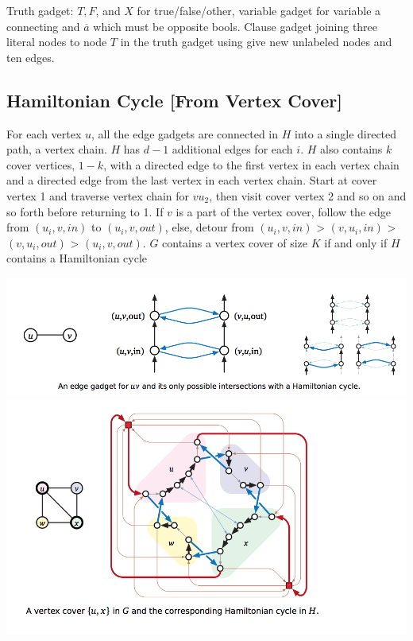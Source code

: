 Truth gadget: $T,F$, and $X$ for true/false/other, variable gadget for variable a connecting and $\overbar{a}$ which must be opposite bools. Clause gadget joining three literal nodes to node $T$ in the truth gadget using give new unlabeled nodes and ten edges.

\subsection{Hamiltonian Cycle [From Vertex Cover]}

For each vertex $u$, all the edge gadgets are connected in $H$ into a single directed path, a vertex chain. $H$ has $d-1$ additional edges for each $i$. $H$ also contains $k$ cover vertices, $1 - k$, with a directed edge to the first vertex in each vertex chain and a directed edge from the last vertex in each vertex chain.
Start at cover vertex 1 and traverse vertex chain for $vu_{2}$, then visit cover vertex 2 and so on and so forth before returning to 1. If $v$ is a part of the vertex cover, follow the edge from $(u_{i}, v, in)$ to $(u_{i}, v, out)$, else, detour from  $(u_{i}, v, in)$ > $(v, u_{i}, in)$ > $(v, u_{i}, out)$ > $(u_{i}, v, out)$.
$G$ contains a vertex cover of size $K$ if and only if $H$ contains a Hamiltonian cycle

\includegraphics[width=\linewidth]{images/edgegadget.png}
\includegraphics[width=\linewidth]{images/hamiltoniancycle.png}

